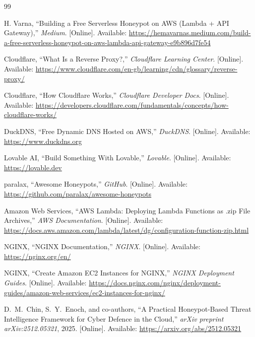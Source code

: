 \documentclass[12pt, a4paper]{report}   %
\begin{document}
{}
\renewcommand{\bibname}{References}
\begin{thebibliography}{99}



H. Varna, ``Building a Free Serverless Honeypot on AWS (Lambda + API Gateway),''
\textit{Medium}. [Online]. Available:
\url{https://hemavarnas.medium.com/build-a-free-serverless-honeypot-on-aws-lambda-api-gateway-e9b896d7fe54}

Cloudflare, ``What Is a Reverse Proxy?,'' \textit{Cloudflare Learning Center}.
[Online]. Available: \url{https://www.cloudflare.com/en-gb/learning/cdn/glossary/reverse-proxy/}

Cloudflare, ``How Cloudflare Works,'' \textit{Cloudflare Developer Docs}.
[Online]. Available: \url{https://developers.cloudflare.com/fundamentals/concepts/how-cloudflare-works/}

DuckDNS, ``Free Dynamic DNS Hosted on AWS,'' \textit{DuckDNS}. [Online]. Available:
\url{https://www.duckdns.org}

Lovable AI, ``Build Something With Lovable,'' \textit{Lovable}. [Online]. Available:
\url{https://lovable.dev}

paralax, ``Awesome Honeypots,'' \textit{GitHub}. [Online]. Available:
\url{https://github.com/paralax/awesome-honeypots}

Amazon Web Services, ``AWS Lambda: Deploying Lambda Functions as .zip File Archives,''
\textit{AWS Documentation}. [Online]. Available:
\url{https://docs.aws.amazon.com/lambda/latest/dg/configuration-function-zip.html}

NGINX, ``NGINX Documentation,'' \textit{NGINX}. [Online]. Available:
\url{https://nginx.org/en/}

NGINX, ``Create Amazon EC2 Instances for NGINX,'' \textit{NGINX Deployment Guides}.
[Online]. Available:
\url{https://docs.nginx.com/nginx/deployment-guides/amazon-web-services/ec2-instances-for-nginx/}

D.~M.~Chin, S.~Y.~Enoch, and co-authors,
``A Practical Honeypot-Based Threat Intelligence Framework for Cyber
Defence in the Cloud,''
\textit{arXiv preprint arXiv:2512.05321}, 2025.
[Online]. Available: \url{https://arxiv.org/abs/2512.05321}


\end{thebibliography}
\end{document}
